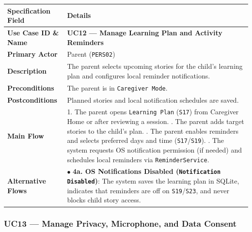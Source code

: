 \noindent\begin{xltabular}{\textwidth}{|p{4.0cm}|X|}
\hline
\textbf{Specification Field} & \textbf{Details} \\ \hline
\endhead
\textbf{Use Case ID \& Name} & \textbf{UC12 — Manage Learning Plan and Activity Reminders} \\ \hline
\textbf{Primary Actor} & Parent (\texttt{PERS02}) \\ \hline
\textbf{Description} & The parent selects upcoming stories for the child's learning plan and configures local reminder notifications. \\ \hline
\textbf{Preconditions} & The parent is in \texttt{Caregiver Mode}. \\ \hline
\textbf{Postconditions} & Planned stories and local notification schedules are saved. \\ \hline
\textbf{Main Flow} & 1. The parent opens \texttt{Learning Plan} (\texttt{S17}) from Caregiver Home or after reviewing a session. . The parent adds target stories to the child's plan. . The parent enables reminders and selects preferred days and time (\texttt{S17}/\texttt{S19}). . The system requests OS notification permission (if needed) and schedules local reminders via \texttt{ReminderService}. \\ \hline
\textbf{Alternative Flows} & $\bullet$ \textbf{4a. OS Notifications Disabled (\texttt{Notification Disabled})}: The system saves the learning plan in SQLite, indicates that reminders are off on \texttt{S19}/\texttt{S23}, and never blocks child story access. \\ \hline
\end{xltabular}



\subsubsection{UC13 — Manage Privacy, Microphone, and Data Consent}


